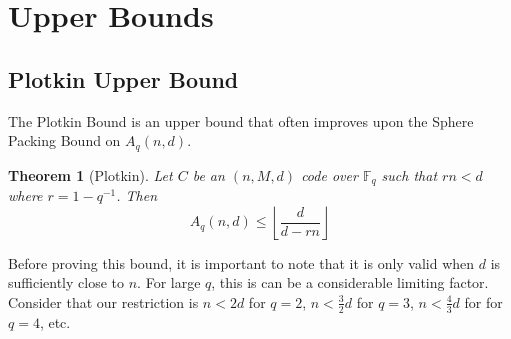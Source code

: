 \documentclass{article}
\newtheorem{theorem}{Theorem}
\numberwithin{theorem}{subsection}
\theoremstyle{definition}
\numberwithin{exmp}{subsection}
\theoremstyle{definition}
\numberwithin{defn}{subsection}
\theoremstyle{definition}
\numberwithin{claim}{subsection}
\begin{document}
\section{Upper Bounds}

\subsection{Plotkin Upper Bound}

The Plotkin Bound is an upper bound that often improves upon the Sphere Packing Bound on $A_q(n,d)$.

\begin{theorem}[Plotkin]
Let $C$ be an $(n,M,d)$ code over $\mathbb{F}_q$ such that $rn < d$ where $r = 1 - q^{-1}$.  Then
\begin{equation}
A_q(n,d) \le \left \lfloor \frac{d}{d-rn}\right\rfloor
\end{equation}
\end{theorem}

Before proving this bound, it is important to note that it is only valid when $d$ is sufficiently close to $n$.  For large $q$, this is can be a considerable limiting factor.
Consider that our restriction is $n<2d$ for $q=2$, $n<\frac{3}{2}d$ for $q=3$, $n<\frac{4}{3}d$ for for $q=4$, etc.
\end{document}
